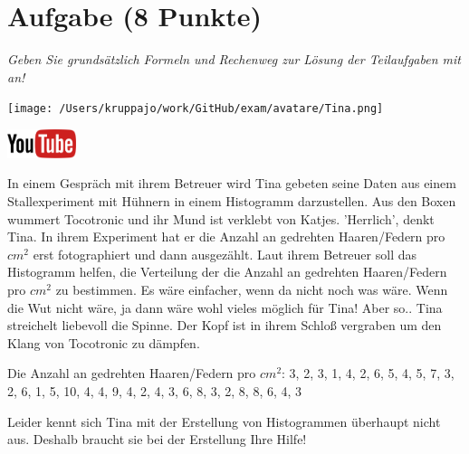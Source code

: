 \documentclass[a4paper, 9pt]{scrartcl}\usepackage[]{graphicx}\usepackage[]{xcolor}
\begin{document}
\section{Aufgabe \hfill (8 Punkte)}

\textit{Geben Sie grundsätzlich Formeln und Rechenweg zur Lösung der Teilaufgaben mit an!} \\[1Ex]
 

 
\begin{minipage}[t]{0.5\textwidth}
\texttt{[image: /Users/kruppajo/work/GitHub/exam/avatare/Tina.png]}
\end{minipage}
\begin{minipage}[t]{0.5\textwidth}
\hfill
\href{https://youtu.be/aXvxGC4YLqk}{\includegraphics[width = 2cm]{img/youtube}}\\[1Ex]
\end{minipage}
\vspace{1ex}



In einem Gespräch mit ihrem Betreuer wird Tina gebeten seine Daten aus einem Stallexperiment mit Hühnern in einem Histogramm darzustellen. Aus den Boxen wummert Tocotronic und ihr Mund ist verklebt von Katjes. 'Herrlich', denkt Tina. In ihrem Experiment hat er die Anzahl an gedrehten Haaren/Federn pro $cm^2$ erst fotographiert und dann ausgezählt. Laut ihrem Betreuer soll das Histogramm helfen, die Verteilung der die Anzahl an gedrehten Haaren/Federn pro $cm^2$ zu bestimmen. Es wäre einfacher, wenn da nicht noch was wäre. Wenn die Wut nicht wäre, ja dann wäre wohl vieles möglich für Tina! Aber so.. Tina streichelt liebevoll die Spinne. Der Kopf ist in ihrem Schloß vergraben um den Klang von Tocotronic zu dämpfen.

\begin{center}
Die Anzahl an gedrehten Haaren/Federn pro $cm^2$: 3, 2, 3, 1, 4, 2, 6, 5, 4, 5, 7, 3, 2, 6, 1, 5, 10, 4, 4, 9, 4, 2, 4, 3, 6, 8, 3, 2, 8, 8, 6, 4, 3
\end{center}

Leider kennt sich Tina mit der Erstellung von Histogrammen überhaupt nicht aus. Deshalb braucht sie bei der Erstellung Ihre Hilfe!
\end{document}
